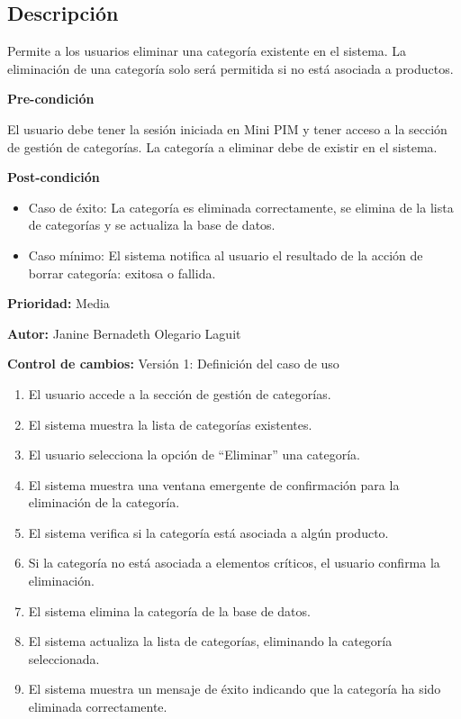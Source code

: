 \newpage %


\subsection*{Descripción}
Permite a los usuarios eliminar una categoría existente en el sistema. La eliminación de una categoría solo será permitida si no está asociada a productos.\par
\vspace{0.15cm}

\textbf{Pre-condición}\par
El usuario debe tener la sesión iniciada en Mini PIM y tener acceso a la sección de gestión de categorías. La categoría a eliminar debe de existir en el sistema.\par
\vspace{0.15cm}

\textbf{Post-condición}
\begin{itemize}
    \item Caso de éxito: La categoría es eliminada correctamente, se elimina de la lista de categorías y se actualiza la base de datos.
    \item Caso mínimo: El sistema notifica al usuario el resultado de la acción de borrar categoría: exitosa o fallida.
\end{itemize}

\textbf{Prioridad: }
Media
\vspace{0.15cm}

\textbf{Autor: }
Janine Bernadeth Olegario Laguit\par
\vspace{0.15cm}

\textbf{Control de cambios: } Versión 1: Definición del caso de uso

\begin{enumerate}
    \item El usuario accede a la sección de gestión de categorías.
    \item El sistema muestra la lista de categorías existentes.
    \item El usuario selecciona la opción de \enquote{Eliminar} una categoría.
    \item El sistema muestra una ventana emergente de confirmación para la eliminación de la categoría.
    \item El sistema verifica si la categoría está asociada a algún producto.
    \item Si la categoría no está asociada a elementos críticos, el usuario confirma la eliminación.
    \item El sistema elimina la categoría de la base de datos.
    \item El sistema actualiza la lista de categorías, eliminando la categoría seleccionada.
    \item El sistema muestra un mensaje de éxito indicando que la categoría ha sido eliminada correctamente.
\end{enumerate}

